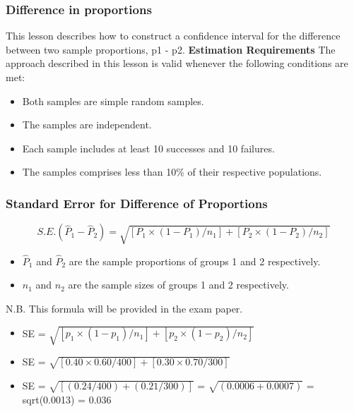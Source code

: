 \begin{frame}
\frametitle{Difference in proportions}
This lesson describes how to construct a confidence interval for the difference between two sample proportions, p1 - p2.
\textbf{Estimation Requirements}
The approach described in this lesson is valid whenever the following conditions are met:

\begin{itemize}
\item Both samples are simple random samples.
\item The samples are independent.
\item Each sample includes at least 10 successes and 10 failures.
\item The samples comprises less than 10\% of their respective populations.
\end{itemize}
\end{frame}


\begin{frame}
\frametitle{Standard Error for Difference of Proportions}

\[S.E. (\hat{P}_1 - \hat{P}_2)  = \sqrt{ [P_1 \times (1 - P_1) / n_1] + [P_2 \times (1 - P_2) / n_2] } \] 
\begin{itemize}
\item $\hat{P}_1$ and $\hat{P}_2$ are the sample proportions of groups 1 and 2 respectively.
\item $n_1$ and $n_2$ are the sample sizes of groups 1 and 2 respectively.
\end{itemize}
N.B. This formula will be provided in the exam paper.
\end{frame}


\begin{frame}
\begin{itemize}
\item SE = $\sqrt{ [p_1 \times (1 - p_1) / n_1] + [p_2 \times (1 - p_2) / n_2] } $
\item SE = $\sqrt{ [0.40 \times 0.60 / 400] + [0.30 \times 0.70 / 300] } $
\item SE  = $\sqrt{[ (0.24 / 400) + (0.21 / 300) ]}$ = $\sqrt{(0.0006 + 0.0007)}$ = sqrt(0.0013) = 0.036 
\end{itemize}
\end{frame}



